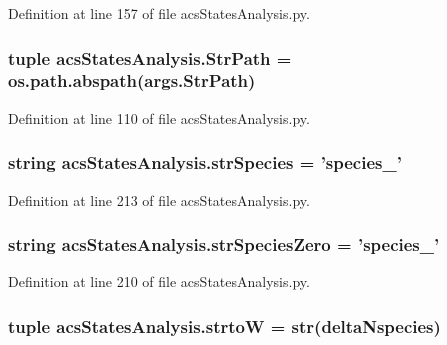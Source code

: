 Definition at line 157 of file acs\-States\-Analysis.\-py.

\hypertarget{a00130_ac34f3f43f888eb6620266d78ce928ceb}{
\subsubsection[{Str\-Path}]{\setlength{\rightskip}{0pt plus 5cm}tuple acs\-States\-Analysis.\-Str\-Path = os.\-path.\-abspath(args.\-Str\-Path)}}\label{a00130_ac34f3f43f888eb6620266d78ce928ceb}


Definition at line 110 of file acs\-States\-Analysis.\-py.

\hypertarget{a00130_ab14d209fe558e83aeede3b657a7241bb}{
\subsubsection[{str\-Species}]{\setlength{\rightskip}{0pt plus 5cm}string acs\-States\-Analysis.\-str\-Species = 'species\-\_\-'}}\label{a00130_ab14d209fe558e83aeede3b657a7241bb}


Definition at line 213 of file acs\-States\-Analysis.\-py.

\hypertarget{a00130_a52f7239b2be2cb978182547960b6c46e}{
\subsubsection[{str\-Species\-Zero}]{\setlength{\rightskip}{0pt plus 5cm}string acs\-States\-Analysis.\-str\-Species\-Zero = 'species\-\_\-'}}\label{a00130_a52f7239b2be2cb978182547960b6c46e}


Definition at line 210 of file acs\-States\-Analysis.\-py.

\hypertarget{a00130_abe05028c33fab522e3b940195eaaa586}{
\subsubsection[{strto\-W}]{\setlength{\rightskip}{0pt plus 5cm}tuple acs\-States\-Analysis.\-strto\-W = str({\bf delta\-Nspecies})}}\label{a00130_abe05028c33fab522e3b940195eaaa586}



